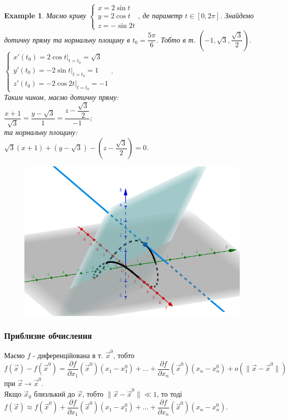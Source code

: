 \documentclass[a4paper, 10pt]{article}
\def\departial#1#2{\dfrac{\partial {#1}}{\partial {#2}}}
\theoremstyle{theoremdd}
\theoremstyle{theoremdd}
\theoremstyle{theoremdd}
\theoremstyle{theoremdd}
\theoremstyle{theoremdd}
\newtheorem{example}[theorem]{Example}
\theoremstyle{theoremdd}
\theoremstyle{theoremdd}
\theoremstyle{theoremdd}
\theoremstyle{theoremdd}
\newcommand\Norm[1]{\lVert#1\rVert}
\begin{document}
\begin{example}
Маємо криву $\begin{cases} x = 2 \sin t \\ y = 2 \cos t \\ z = -\sin 2t \end{cases}$, де параметр $t \in [0,2\pi]$. Знайдемо дотичну пряму та нормальну площину в $t_0 = \dfrac{5 \pi}{6}$. Тобто в т. $\left(-1,\sqrt{3}, \dfrac{\sqrt{3}}{2} \right)$.\\
$\begin{cases}
x'(t_0) = 2 \cos t \Big|_{t = t_0} = \sqrt{3} \\
y'(t_0) = -2 \sin t \Big|_{t = t_0} = 1 \\
z'(t_0) = -2 \cos 2t \Big|_{t = t_0} = -1
\end{cases}$.\\
Таким чином, маємо дотичну пряму:\\
$\dfrac{x+1}{\sqrt{3}} = \dfrac{y-\sqrt{3}}{1} = \dfrac{z-\dfrac{\sqrt{3}}{2}}{-1}$;\\
та нормальну площину:\\
$\sqrt{3}(x+1) + (y-\sqrt{3}) - \left( z - \dfrac{\sqrt{3}}{2} \right) = 0$.
\begin{figure}[H]
\centering
\includegraphics[scale=0.4]{tangent_line.png}
\end{figure}
\end{example}

\subsubsection{Приблизне обчислення}
Маємо $f$ - диференційована в т. $\vec{x}^0$, тобто\\
$f(\vec{x}) - f(\vec{x}^0) = \departial{f}{x_1}(\vec{x}^0)(x_1-x_1^0) + \dots + \departial{f}{x_n}(\vec{x}^0)(x_n-x_n^0) + o(\Norm{\vec{x}-\vec{x}^0})$ при $\vec{x} \to \vec{x}^0$.\\
Якщо $\vec{x}_0$ близлький до $\vec{x}$, тобто $\Norm{\vec{x} - \vec{x}^0} \ll 1$, то тоді\\
$f(\vec{x}) \approx f(\vec{x}^0) + \departial{f}{x_1}(\vec{x}^0)(x_1-x_1^0) + \dots + \departial{f}{x_n}(\vec{x}^0)(x_n-x_n^0)$.
\end{document}
